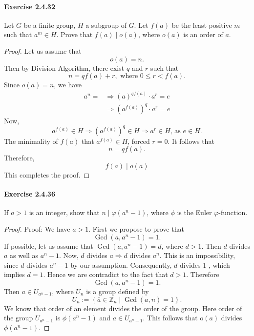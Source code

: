 \documentclass{article}
\begin{document}
\paragraph{Exercise 2.4.32} Let $G$ be a finite group, $H$ a subgroup of $G$. Let $f(a)$ be the least positive $m$ such that $a^m \in H$. Prove that $f(a) \mid o(a)$, where $o(a)$ is an order of $a$.
\begin{proof}
    Let us assume that
$$
o(a)=n .
$$
Then by Division Algorithm, there exist $q$ and $r$ such that
$$
n=q f(a)+r, \text { where } 0 \leq r<f(a) .
$$
Since $o(a)=n$, we have
$$
\begin{aligned}
a^n= & \Longrightarrow(a)^{q f(a)} \cdot a^r=e \\
& \Longrightarrow\left(a^{f(a)}\right)^q \cdot a^r=e
\end{aligned}
$$
Now,
$$
a^{f(a)} \in H \Longrightarrow\left(a^{f(a)}\right)^q \in H \Longrightarrow a^r \in H \text {, as } e \in H .
$$
The minimality of $f(a)$ that $a^{f(a)} \in H$, forced $r=0$. It follows that
$$
n=q f(a) .
$$
Therefore,
$$
f(a) \mid o(a)
$$
This completes the proof.
\end{proof}


\paragraph{Exercise 2.4.36} If $a > 1$ is an integer, show that $n \mid \varphi(a^n - 1)$, where $\phi$ is the Euler $\varphi$-function.
\begin{proof}
    Proof: We have $a>1$. First we propose to prove that
$$
\operatorname{Gcd}\left(a, a^n-1\right)=1 .
$$
If possible, let us assume that
$\operatorname{Gcd}\left(a, a^n-1\right)=d$, where $d>1$.
Then
$d$ divides $a$ as well as $a^n-1$.
Now,
$d$ divides $a \Longrightarrow d$ divides $a^n$.
This is an impossibility, since $d$ divides $a^n-1$ by our assumption. Consequently, $d$ divides 1 , which implies $d=1$. Hence we are contradict to the fact that $d>1$. Therefore
$$
\operatorname{Gcd}\left(a, a^n-1\right)=1 .
$$
Then $a \in U_{a^n-1}$, where $U_n$ is a group defined by
$$
U_n:=\left\{\bar{a} \in \mathbb{Z}_n \mid \operatorname{Gcd}(a, n)=1\right\} .
$$
We know that order of an element divides the order of the group. Here order of the group $U_{a^n-1}$ is $\phi\left(a^n-1\right)$ and $a \in U_{a^n-1}$. This follows that $\mathrm{o}(a)$ divides $\phi\left(a^n-1\right)$.
\end{proof}
\end{document}
